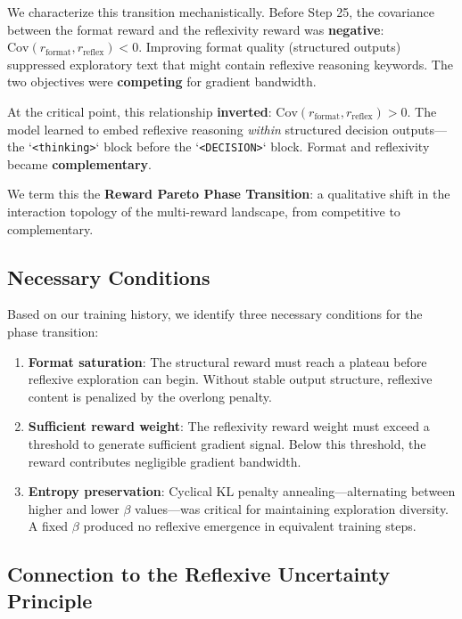 \documentclass{article}
\begin{document}
We characterize this transition mechanistically. Before Step 25, the covariance between the format reward and the reflexivity reward was \textbf{negative}: $\text{Cov}(r_{\text{format}}, r_{\text{reflex}}) < 0$. Improving format quality (structured outputs) suppressed exploratory text that might contain reflexive reasoning keywords. The two objectives were \textbf{competing} for gradient bandwidth.

At the critical point, this relationship \textbf{inverted}: $\text{Cov}(r_{\text{format}}, r_{\text{reflex}}) > 0$. The model learned to embed reflexive reasoning \textit{within} structured decision outputs---the `\texttt{<thinking>}` block before the `\texttt{<DECISION>}` block. Format and reflexivity became \textbf{complementary}.

We term this the \textbf{Reward Pareto Phase Transition}: a qualitative shift in the interaction topology of the multi-reward landscape, from competitive to complementary.

\subsection{Necessary Conditions}

Based on our training history, we identify three necessary conditions for the phase transition:

\begin{enumerate}[leftmargin=*]
\item \textbf{Format saturation}: The structural reward must reach a plateau before reflexive exploration can begin. Without stable output structure, reflexive content is penalized by the overlong penalty.
\item \textbf{Sufficient reward weight}: The reflexivity reward weight must exceed a threshold to generate sufficient gradient signal. Below this threshold, the reward contributes negligible gradient bandwidth.
\item \textbf{Entropy preservation}: Cyclical KL penalty annealing---alternating between higher and lower $\beta$ values---was critical for maintaining exploration diversity. A fixed $\beta$ produced no reflexive emergence in equivalent training steps.
\end{enumerate}

\subsection{Connection to the Reflexive Uncertainty Principle}
\end{document}
